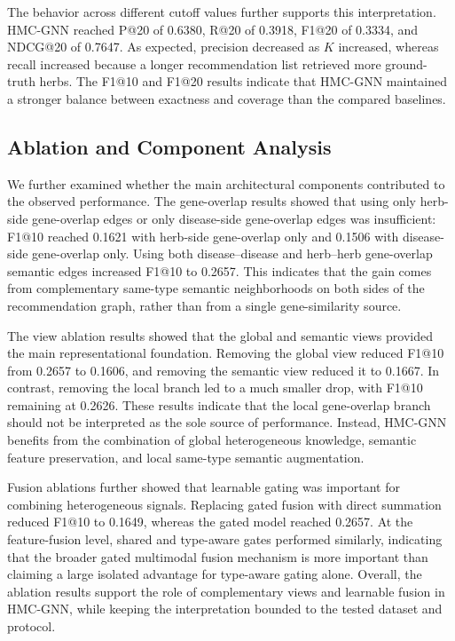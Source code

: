 \documentclass[journal,twoside,web]{ieeecolor}
\begin{document}
The behavior across different cutoff values further supports this interpretation. HMC-GNN reached P@20 of 0.6380, R@20 of 0.3918, F1@20 of 0.3334, and NDCG@20 of 0.7647. As expected, precision decreased as $K$ increased, whereas recall increased because a longer recommendation list retrieved more ground-truth herbs. The F1@10 and F1@20 results indicate that HMC-GNN maintained a stronger balance between exactness and coverage than the compared baselines.

\subsection{Ablation and Component Analysis}
\label{subsec:ablation_analysis}

We further examined whether the main architectural components contributed to the observed performance. The gene-overlap results showed that using only herb-side gene-overlap edges or only disease-side gene-overlap edges was insufficient: F1@10 reached 0.1621 with herb-side gene-overlap only and 0.1506 with disease-side gene-overlap only. Using both disease--disease and herb--herb gene-overlap semantic edges increased F1@10 to 0.2657. This indicates that the gain comes from complementary same-type semantic neighborhoods on both sides of the recommendation graph, rather than from a single gene-similarity source.

The view ablation results showed that the global and semantic views provided the main representational foundation. Removing the global view reduced F1@10 from 0.2657 to 0.1606, and removing the semantic view reduced it to 0.1667. In contrast, removing the local branch led to a much smaller drop, with F1@10 remaining at 0.2626. These results indicate that the local gene-overlap branch should not be interpreted as the sole source of performance. Instead, HMC-GNN benefits from the combination of global heterogeneous knowledge, semantic feature preservation, and local same-type semantic augmentation.

Fusion ablations further showed that learnable gating was important for combining heterogeneous signals. Replacing gated fusion with direct summation reduced F1@10 to 0.1649, whereas the gated model reached 0.2657. At the feature-fusion level, shared and type-aware gates performed similarly, indicating that the broader gated multimodal fusion mechanism is more important than claiming a large isolated advantage for type-aware gating alone. Overall, the ablation results support the role of complementary views and learnable fusion in HMC-GNN, while keeping the interpretation bounded to the tested dataset and protocol.
\end{document}
